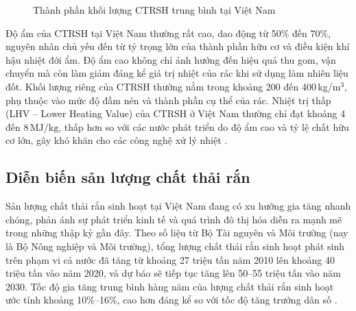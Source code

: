 \documentclass[../main.tex]{subfiles}
\begin{document}
\begin{figure}[H]
\centering
\makeatletter
\def\pgfpie@legend#1{%
  \coordinate[xshift=0.8cm,
  yshift={(\the\pgfpie@sliceLength*0.5+1)*0.8cm}] (pgfpie@legendpos) at
  (current bounding box.east);

  \scope[node distance=0.8cm]
    \foreach \pgfpie@p/\pgfpie@t [count=\pgfpie@i from 0] in {#1}
    {
      \pgfpie@findColor{\pgfpie@i}
      \node[draw, fill={\pgfpie@thecolor}, \pgfpie@style, below of={pgfpie@legendpos}, label={0:{\pgfpie@t}}] (pgfpie@legendpos) {};
    }
  \endscope
}
\makeatother
{}
\caption{Thành phần khối lượng CTRSH trung bình tại Việt Nam}
\label{fig:thanh-phan-rac-viet-nam}
\end{figure}

Độ ẩm của CTRSH tại Việt Nam thường rất cao, dao động từ 50$\%$ đến 70$\%$, nguyên nhân chủ yếu đến từ tỷ trọng lớn của thành phần hữu cơ và điều kiện khí hậu nhiệt đới ẩm. Độ ẩm cao không chỉ ảnh hưởng đến hiệu quả thu gom, vận chuyển mà còn làm giảm đáng kể giá trị nhiệt của rác khi sử dụng làm nhiên liệu đốt. Khối lượng riêng của CTRSH thường nằm trong khoảng 200 đến 400\,kg/$\text{m}^3$, phụ thuộc vào mức độ đầm nén và thành phần cụ thể của rác. Nhiệt trị thấp (LHV -- Lower Heating Value) của CTRSH ở Việt Nam thường chỉ đạt khoảng 4 đến 8\,$\text{MJ}/\text{kg}$, thấp hơn so với các nước phát triển do độ ẩm cao và tỷ lệ chất hữu cơ lớn, gây khó khăn cho các công nghệ xử lý nhiệt \cite{Quang2024}.

\subsection{Diễn biến sản lượng chất thải rắn}

Sản lượng chất thải rắn sinh hoạt tại Việt Nam đang có xu hướng gia tăng nhanh chóng, phản ánh sự phát triển kinh tế và quá trình đô thị hóa diễn ra mạnh mẽ trong những thập kỷ gần đây. Theo số liệu từ Bộ Tài nguyên và Môi trường (nay là Bộ Nông nghiệp và Môi trường), tổng lượng chất thải rắn sinh hoạt phát sinh trên phạm vi cả nước đã tăng từ khoảng 27 triệu tấn năm 2010 lên khoảng 40 triệu tấn vào năm 2020, và dự báo sẽ tiếp tục tăng lên 50--55 triệu tấn vào năm 2030. Tốc độ gia tăng trung bình hàng năm của lượng chất thải rắn sinh hoạt ước tính khoảng 10$\%$--16$\%$, cao hơn đáng kể so với tốc độ tăng trưởng dân số \cite{MONRE2020}.
\end{document}
